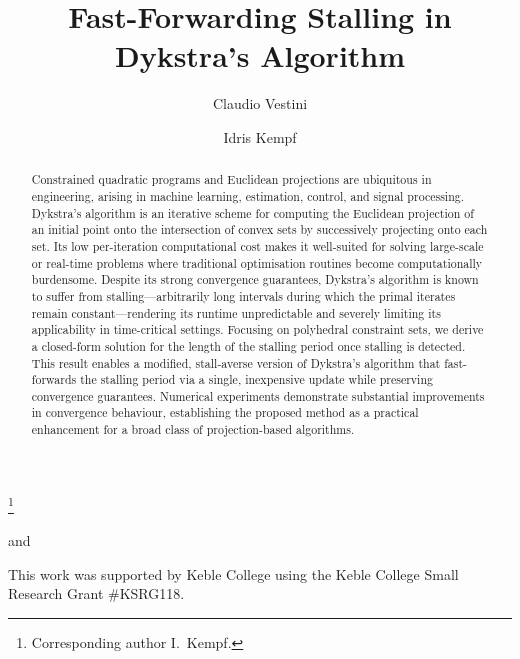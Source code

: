 \documentclass[onecolumn]{autart}
\begin{document}
\begin{frontmatter}
\title{Fast-Forwarding Stalling in Dykstra's Algorithm}
\thanks[footnoteinfo]{Corresponding author I.~Kempf.}
\author[oxf]{Claudio Vestini}
and
\author[oxf]{Idris Kempf}
\address[oxf]{Department of Engineering Science, University of Oxford, Parks Road, Oxford, OX1 3PJ, UK}


\begin{abstract}
Constrained quadratic programs and Euclidean projections are ubiquitous in engineering, arising in machine learning, estimation, control, and signal processing. Dykstra's algorithm is an iterative scheme for computing the Euclidean projection of an initial point onto the intersection of convex sets by successively projecting onto each set. Its low per-iteration computational cost makes it well-suited for solving large-scale or real-time problems where traditional optimisation routines become computationally burdensome. Despite its strong convergence guarantees, Dykstra's algorithm is known to suffer from stalling---arbitrarily long intervals during which the primal iterates remain constant---rendering its runtime unpredictable and severely limiting its applicability in time-critical settings. Focusing on polyhedral constraint sets, we derive a closed-form solution for the length of the stalling period once stalling is detected. This result enables a modified, stall-averse version of Dykstra's algorithm that fast-forwards the stalling period via a single, inexpensive update while preserving convergence guarantees. Numerical experiments demonstrate substantial improvements in convergence behaviour, establishing the proposed method as a practical enhancement for a broad class of projection-based algorithms.
\end{abstract}

\end{frontmatter}








\begin{ack}
This work was supported by Keble College using the Keble College Small Research Grant \#KSRG118.
\end{ack}

\newpage
\printbibliography
\end{document}

